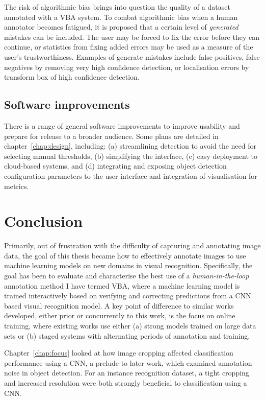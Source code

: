 The risk of algorithmic bias brings into question the quality of a dataset annotated with a \gls{VBA} system.  To combat algorithmic bias when a human annotator becomes fatigued, it is proposed that a certain level of \emph{generated} mistakes can be included. The user may be forced to fix the error before they can continue, or statistics from fixing added errors may be used as a measure of the user's trustworthiness. Examples of generate mistakes include false positives, false negatives by removing very high confidence detection, or localisation errors by transform box of high confidence detection. 


\subsection{Software improvements}

There is a range of general software improvements to improve usability and prepare for release to a broader audience. Some plans are detailed in chapter~\ref{chap:design}, including: (a) streamlining detection to avoid the need for selecting manual thresholds, (b) simplifying the interface, (c) easy deployment to cloud-based systems, and (d) integrating and exposing object detection configuration parameters to the user interface and integration of visualisation for metrics.

\section{Conclusion}
\label{sec:conclusion}
\glsresetall

Primarily, out of frustration with the difficulty of capturing and annotating image data, the goal of this thesis became how to effectively annotate images to use machine learning models on new domains in visual recognition. Specifically, the goal has been to evaluate and characterise the best use of a \emph{human-in-the-loop} annotation method I have termed \gls{VBA}, where a machine learning model is trained interactively based on verifying and correcting predictions from a \gls{CNN} based visual recognition model. A key point of difference to similar works developed, either prior or concurrently to this work, is the focus on online training, where existing works use either (a) strong models trained on large data sets or (b) staged systems with alternating periods of annotation and training. 

Chapter~\ref{chap:focus} looked at how image cropping affected classification performance using a \gls{CNN}, a prelude to later work, which examined annotation noise in object detection. For an instance recognition dataset,  a tight cropping and increased resolution were both strongly beneficial to classification using a \gls{CNN}.

